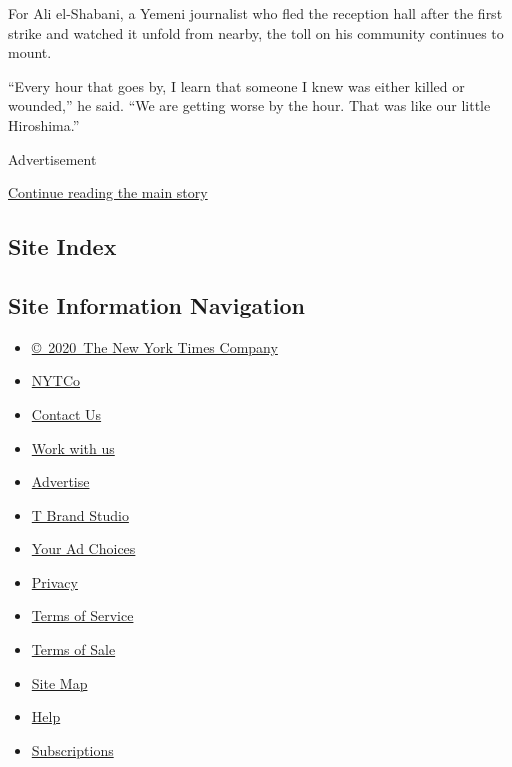 For Ali el-Shabani, a Yemeni journalist who fled the reception hall
after the first strike and watched it unfold from nearby, the toll on
his community continues to mount.

``Every hour that goes by, I learn that someone I knew was either killed
or wounded,'' he said. ``We are getting worse by the hour. That was like
our little Hiroshima.''

Advertisement

\protect\hyperlink{after-bottom}{Continue reading the main story}

\hypertarget{site-index}{%
\subsection{Site Index}\label{site-index}}

\hypertarget{site-information-navigation}{%
\subsection{Site Information
Navigation}\label{site-information-navigation}}

\begin{itemize}
\tightlist
\item
  \href{https://help.nytimes.com/hc/en-us/articles/115014792127-Copyright-notice}{©~2020~The
  New York Times Company}
\end{itemize}

\begin{itemize}
\tightlist
\item
  \href{https://www.nytco.com/}{NYTCo}
\item
  \href{https://help.nytimes.com/hc/en-us/articles/115015385887-Contact-Us}{Contact
  Us}
\item
  \href{https://www.nytco.com/careers/}{Work with us}
\item
  \href{https://nytmediakit.com/}{Advertise}
\item
  \href{http://www.tbrandstudio.com/}{T Brand Studio}
\item
  \href{https://www.nytimes.com/privacy/cookie-policy\#how-do-i-manage-trackers}{Your
  Ad Choices}
\item
  \href{https://www.nytimes.com/privacy}{Privacy}
\item
  \href{https://help.nytimes.com/hc/en-us/articles/115014893428-Terms-of-service}{Terms
  of Service}
\item
  \href{https://help.nytimes.com/hc/en-us/articles/115014893968-Terms-of-sale}{Terms
  of Sale}
\item
  \href{https://spiderbites.nytimes.com}{Site Map}
\item
  \href{https://help.nytimes.com/hc/en-us}{Help}
\item
  \href{https://www.nytimes.com/subscription?campaignId=37WXW}{Subscriptions}
\end{itemize}
